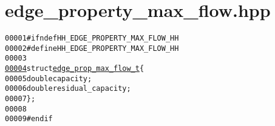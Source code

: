 \hypertarget{edge__property__max__flow_8hpp_source}{
\section{edge\_\-property\_\-max\_\-flow.hpp}
}


\begin{footnotesize}\begin{alltt}
00001 \textcolor{preprocessor}{#ifndef HH\_EDGE\_PROPERTY\_MAX\_FLOW\_HH}
00002 \textcolor{preprocessor}{}\textcolor{preprocessor}{#define HH\_EDGE\_PROPERTY\_MAX\_FLOW\_HH}
00003 \textcolor{preprocessor}{}
\hypertarget{edge__property__max__flow_8hpp_source_l00004}{}\hyperlink{structedge__prop__max__flow__t}{00004} \textcolor{keyword}{struct }\hyperlink{structedge__prop__max__flow__t}{edge_prop_max_flow_t}\{
00005         \textcolor{keywordtype}{double} capacity;
00006         \textcolor{keywordtype}{double} residual\_capacity;  
00007 \};
00008 
00009 \textcolor{preprocessor}{#endif }
\end{alltt}\end{footnotesize}
